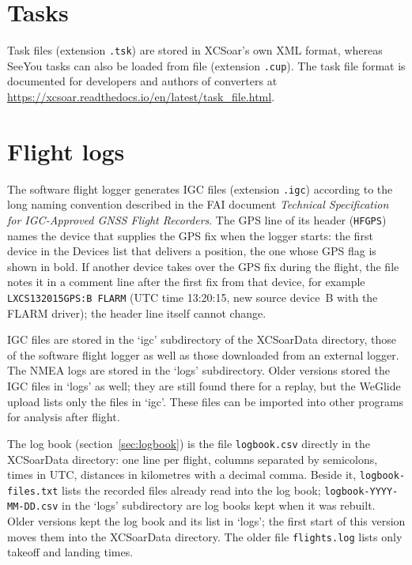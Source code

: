 \section{Tasks}

Task files (extension \verb|.tsk|) are stored in XCSoar's own XML format,
whereas SeeYou tasks can also be loaded from file (extension \verb|.cup|).
The task file format is documented for developers and authors of
converters at \url{https://xcsoar.readthedocs.io/en/latest/task_file.html}.

\section{Flight logs} \label{sec:logfiles}

The software flight logger generates IGC files (extension \verb|.igc|)
according to the long naming convention described in the FAI 
document {\em Technical Specification for IGC-Approved GNSS Flight Recorders}.  
The GPS line of its header (\verb|HFGPS|) names the device that supplies
the GPS fix when the logger starts: the first device in the Devices list
that delivers a position, the one whose GPS flag is shown in bold.
If another device takes over the GPS fix during the flight, the file
notes it in a comment line after the first fix from that device, for
example \verb|LXCS132015GPS:B FLARM| (UTC time 13:20:15, new source
device~B with the FLARM driver); the header line itself cannot change.

IGC files are stored in the `igc' subdirectory of the XCSoarData
directory, those of the software flight logger as well as those
downloaded from an external logger.  The NMEA logs are stored in the
`logs' subdirectory.  Older versions stored the IGC files in `logs' as
well; they are still found there for a replay, but the WeGlide upload
lists only the files in `igc'.  These files can be imported into other
programs for analysis after flight.

The log book (section~\ref{sec:logbook}) is the file \verb|logbook.csv|
directly in the XCSoarData directory: one line per flight, columns separated by
semicolons, times in UTC, distances in kilometres with a decimal
comma.  Beside it, \verb|logbook-files.txt| lists the recorded files
already read into the log book; \verb|logbook-YYYY-MM-DD.csv| in the
`logs' subdirectory are log books kept when it was rebuilt.  Older
versions kept the log book and its list in `logs'; the first start of
this version moves them into the XCSoarData directory.  The older file
\verb|flights.log| lists only takeoff and landing times.

